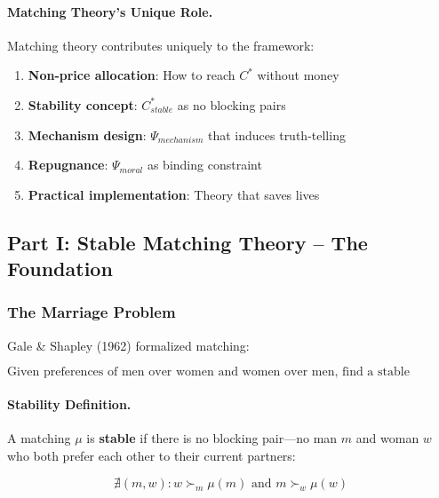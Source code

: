\paragraph{Matching Theory's Unique Role.}
Matching theory contributes uniquely to the framework:
\begin{enumerate}
    \item \textbf{Non-price allocation}: How to reach $C^*$ without money
    \item \textbf{Stability concept}: $C^*_{stable}$ as no blocking pairs
    \item \textbf{Mechanism design}: $\Psi_{mechanism}$ that induces truth-telling
    \item \textbf{Repugnance}: $\Psi_{moral}$ as binding constraint
    \item \textbf{Practical implementation}: Theory that saves lives
\end{enumerate}

\subsection{Part I: Stable Matching Theory – The Foundation}

\subsubsection{The Marriage Problem}

Gale \& Shapley (1962) formalized matching:

\begin{equation}
\boxed{
\text{Given preferences of men over women and women over men, find a stable matching}
}
\label{eq:gs-problem}
\end{equation}

\paragraph{Stability Definition.}
A matching $\mu$ is \textbf{stable} if there is no blocking pair---no man $m$ 
and woman $w$ who both prefer each other to their current partners:

\begin{equation}
\nexists (m, w): w \succ_m \mu(m) \text{ and } m \succ_w \mu(w)
\end{equation}

